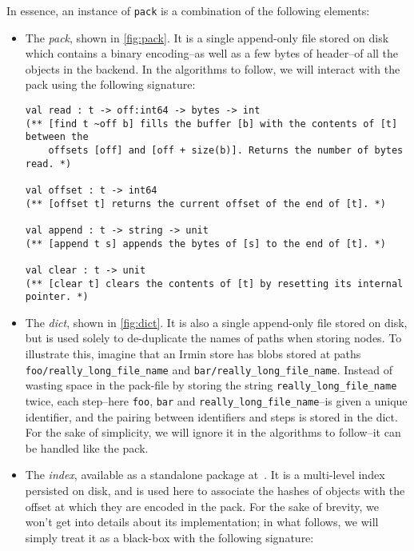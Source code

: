 \bigskip
In essence, an instance of \texttt{pack} is a combination of the following elements:
\begin{itemize}
  \item
        The \emph{pack}, shown in \cref{fig:pack}. It is a single append-only file stored on disk which contains a binary encoding--as well as a few bytes of header--of all the objects in the backend. In the algorithms to follow, we will interact with the pack using the following signature:

        \begin{verbatim}
val read : t -> off:int64 -> bytes -> int
(** [find t ~off b] fills the buffer [b] with the contents of [t] between the
    offsets [off] and [off + size(b)]. Returns the number of bytes read. *)

val offset : t -> int64
(** [offset t] returns the current offset of the end of [t]. *)

val append : t -> string -> unit
(** [append t s] appends the bytes of [s] to the end of [t]. *)

val clear : t -> unit
(** [clear t] clears the contents of [t] by resetting its internal pointer. *)
  \end{verbatim}

        

  \item
        The \emph{dict}, shown in \cref{fig:dict}. It is also a single append-only file stored on disk, but is used solely to de-duplicate the names of paths when storing nodes. To illustrate this, imagine that an Irmin store has blobs stored at paths \texttt{foo/really\_long\_file\_name} and \texttt{bar/really\_long\_file\_name}. Instead of wasting space in the pack-file by storing the string \texttt{really\_long\_file\_name} twice, each step--here \texttt{foo}, \texttt{bar} and \texttt{really\_long\_file\_name}--is given a unique identifier, and the pairing between identifiers and steps is stored in the dict. For the sake of simplicity, we will ignore it in the algorithms to follow--it can be handled like the pack.

        

  \item
        The \emph{index}, available as a standalone package at~\cite{index-github}. It is a multi-level index persisted on disk, and is used here to associate the hashes of objects with the offset at which they are encoded in the pack. For the sake of brevity, we won't get into details about its implementation; in what follows, we will simply treat it as a black-box with the following signature:


\end{itemize}
